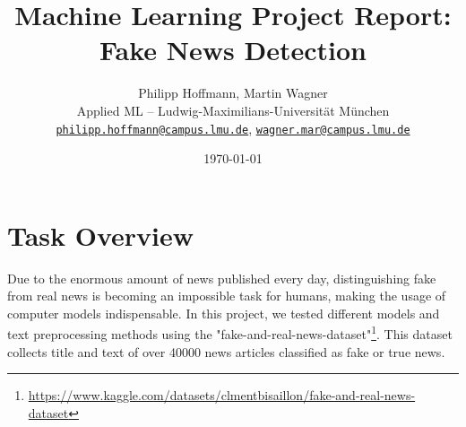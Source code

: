 \documentclass[10pt]{article}
\title{\textbf{Machine Learning Project Report: Fake News Detection}}
\author{Philipp Hoffmann, Martin Wagner \\
	Applied ML – Ludwig-Maximilians-Universität München \\
	\texttt{\href{mailto:philipp.hoffmann@campus.lmu.de}{philipp.hoffmann@campus.lmu.de}},
	\texttt{\href{mailto:wagner.mar@campus.lmu.de}{wagner.mar@campus.lmu.de}}}
\date{\today}
\begin{document}
	
	\maketitle
	\section{Task Overview}
	Due to the enormous amount of news published every day, distinguishing fake from real news is becoming an impossible task for humans, making the usage of computer models indispensable. In this project, we tested different models and text preprocessing methods using the "fake-and-real-news-dataset"\footnote{\url{https://www.kaggle.com/datasets/clmentbisaillon/fake-and-real-news-dataset}}. This dataset collects title and text of over 40000 news articles classified as fake or true news.
	
\end{document}

